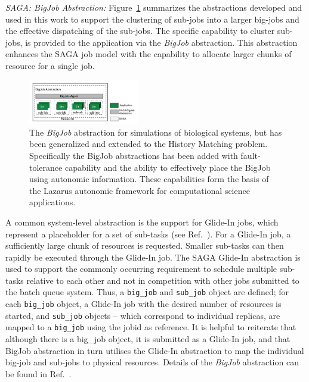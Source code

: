 \documentclass{sig-alternate}
\newcommand{\up}{\vspace*{-0.3em}}
\begin{document}
{\it SAGA: BigJob Abstraction:} Figure~\ref{fig:abstractions} summarizes the abstractions developed
and used in this work to support the clustering of sub-jobs into a
larger big-jobs and the effective dispatching of the sub-jobs.  The
specific capability to cluster sub-jobs, is provided to the
application via the \emph{BigJob} abstraction. This abstraction
enhances the SAGA job model with the capability to allocate larger
chunks of resource for a single job.  
\begin{figure}[t]
      \centering
      \includegraphics[width=0.430\textwidth]{./figures/enkf_bigjob.pdf}
      \caption{\footnotesize The {\it BigJob} abstraction for simulations of
        biological systems, but has been generalized and extended to
        the History Matching problem. Specifically the BigJob
        abstractions has been added with fault-tolerance capability
        and the ability to effectively place the BigJob using
        autonomic information. These capabilities form the basis of
        the Lazarus autonomic framework for computational science
        applications.}
      \label{fig:abstractions}\up\up\up \up\up\up
\end{figure}
A common system-level abstraction is the support for Glide-In jobs, which represent a placeholder for a set of sub-tasks (see Ref.~\cite{saga_royalsoc}).  For a Glide-In job, a sufficiently large chunk of resources is requested. Smaller sub-tasks can then rapidly be executed through the Glide-In job.
The SAGA Glide-In abstraction is used to support the commonly
occurring requirement to schedule multiple sub-tasks relative to each
other and not in competition with other jobs submitted to the batch
queue system.  Thus, a \texttt{big\_job} and \texttt{sub\_job} object
are defined; for each \texttt{big\_job} object, a Glide-In job with
the desired number of resources is started, and \texttt{sub\_job}
objects -- which correspond to individual replicas, are mapped to a
\texttt{big\_job} using the jobid as reference. It is helpful to
reiterate that although there is a big\_job object, it is submitted as
a Glide-In job, and that BigJob abstraction in turn utilises the
Glide-In abstraction to map the individual big-job and sub-jobs to
physical resources.  Details of the \emph{BigJob} abstraction can be
found in Ref.~\cite{saga_royalsoc}.
\end{document}
